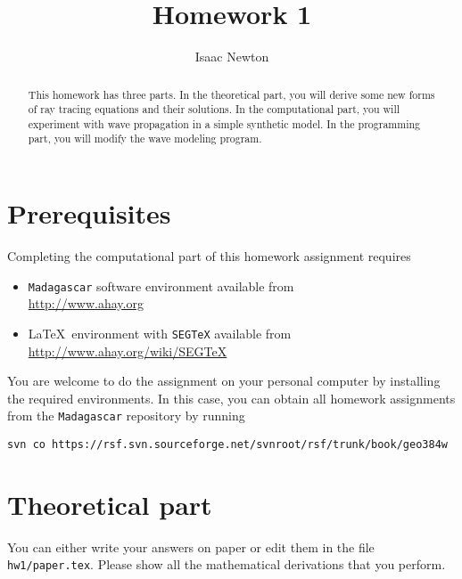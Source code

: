 \author{Isaac Newton} 
\title{Homework 1}

\begin{abstract}
  This homework has three parts. In the theoretical part, you will
  derive some new forms of ray tracing equations and their solutions.
  In the computational part, you will experiment with wave propagation
  in a simple synthetic model. In the programming part, you will modify
  the wave modeling program.
\end{abstract}

\section{Prerequisites}

Completing the computational part of this homework assignment requires
\begin{itemize}
\item \texttt{Madagascar} software environment available from \\
\url{http://www.ahay.org}
\item \LaTeX\ environment with \texttt{SEGTeX} available from \\ 
\url{http://www.ahay.org/wiki/SEGTeX}
\end{itemize}

You are welcome to do the assignment on your personal computer by
installing the required environments. In this case, you can obtain all
homework assignments from the \texttt{Madagascar} repository by running
\begin{verbatim}
svn co https://rsf.svn.sourceforge.net/svnroot/rsf/trunk/book/geo384w 
\end{verbatim}


\section{Theoretical part}

You can either write your answers on paper or edit them in the file
\verb#hw1/paper.tex#. Please show all the mathematical
derivations that you perform.

